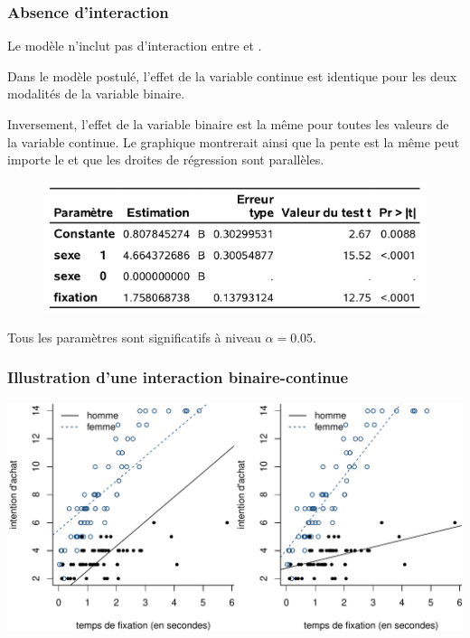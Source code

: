 \documentclass[xcolor={dvipsnames}]{beamer}
\begin{document}
 \begin{frame}[fragile]
\frametitle{Absence d'interaction }
\bi
\item Le modèle n'inclut pas d'interaction entre  et .
\item Dans le modèle postulé, l'effet de la variable continue  est \alert{identique} pour les deux modalités de la variable binaire. 
\item Inversement, l'effet de la variable binaire est la même pour toutes les valeurs de la variable continue. Le graphique montrerait ainsi que la pente est la même peut importe le  et que les droites de régression sont \alert{parallèles}. 
\ei
\begin{figure}
 \centering
 \includegraphics[width=0.65\linewidth]{img/c2/diapos3-e18}
\end{figure}
{ \footnotesize Tous les paramètres sont significatifs à niveau $\alpha =0.05$.}
\end{frame}

 \begin{frame}[fragile]
  \frametitle{Illustration d'une interaction binaire-continue}
  \includegraphics[width =\textwidth]{img/c2/03-linreg-interaction_cont_fr.pdf}
 \end{frame}
\end{document}
